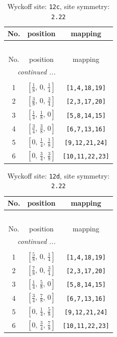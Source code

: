 \documentclass[fleqn,8pt]{jsarticle}
\begin{document}
\renewcommand{\arraystretch}{1.2}
\begin{longtable}{ccc}
\caption{Wyckoff site: {\tt 12c}, site symmetry: {\tt 2.22}}
 \\
 \hline \hline
No. & position & mapping \\ \hline \endfirsthead

\multicolumn{2}{l}{\tablename\ \thetable{}} \\
 \hline \hline
No. & position & mapping \\ \hline \endhead

 \hline \hline
\multicolumn{2}{r}{\footnotesize\it continued ...} \\ \endfoot

 \hline \hline
\multicolumn{2}{r}{} \\ \endlastfoot

1 & $\left[ \frac{1}{8},\, 0,\, \frac{1}{4} \right]$ & {\tt [1,4,18,19]} \\ \hline
2 & $\left[ \frac{3}{8},\, 0,\, \frac{3}{4} \right]$ & {\tt [2,3,17,20]} \\ \hline
3 & $\left[ \frac{1}{4},\, \frac{1}{8},\, 0 \right]$ & {\tt [5,8,14,15]} \\ \hline
4 & $\left[ \frac{3}{4},\, \frac{3}{8},\, 0 \right]$ & {\tt [6,7,13,16]} \\ \hline
5 & $\left[ 0,\, \frac{1}{4},\, \frac{1}{8} \right]$ & {\tt [9,12,21,24]} \\ \hline
6 & $\left[ 0,\, \frac{3}{4},\, \frac{3}{8} \right]$ & {\tt [10,11,22,23]} \\
\end{longtable}
\renewcommand{\arraystretch}{1.2}
\begin{longtable}{ccc}
\caption{Wyckoff site: {\tt 12d}, site symmetry: {\tt 2.22}}
 \\
 \hline \hline
No. & position & mapping \\ \hline \endfirsthead

\multicolumn{2}{l}{\tablename\ \thetable{}} \\
 \hline \hline
No. & position & mapping \\ \hline \endhead

 \hline \hline
\multicolumn{2}{r}{\footnotesize\it continued ...} \\ \endfoot

 \hline \hline
\multicolumn{2}{r}{} \\ \endlastfoot

1 & $\left[ \frac{5}{8},\, 0,\, \frac{1}{4} \right]$ & {\tt [1,4,18,19]} \\ \hline
2 & $\left[ \frac{7}{8},\, 0,\, \frac{3}{4} \right]$ & {\tt [2,3,17,20]} \\ \hline
3 & $\left[ \frac{1}{4},\, \frac{5}{8},\, 0 \right]$ & {\tt [5,8,14,15]} \\ \hline
4 & $\left[ \frac{3}{4},\, \frac{7}{8},\, 0 \right]$ & {\tt [6,7,13,16]} \\ \hline
5 & $\left[ 0,\, \frac{1}{4},\, \frac{5}{8} \right]$ & {\tt [9,12,21,24]} \\ \hline
6 & $\left[ 0,\, \frac{3}{4},\, \frac{7}{8} \right]$ & {\tt [10,11,22,23]} \\
\end{longtable}
\end{document}
